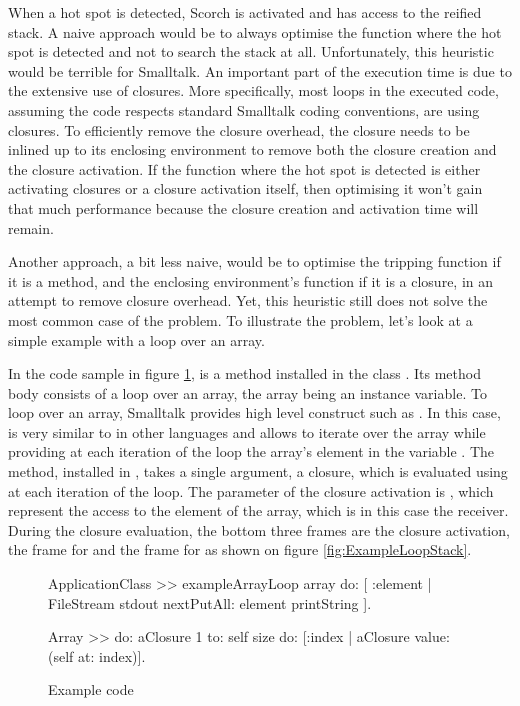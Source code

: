 \documentclass[a4paper,12pt,twoside]{../includes/ThesisStyle}
\begin{document}
When a hot spot is detected, Scorch is activated and has access to the reified stack. A naive approach would be to always optimise the function where the hot spot is detected and not to search the stack at all. Unfortunately, this heuristic would be terrible for Smalltalk. An important part of the execution time is due to the extensive use of closures. More specifically, most loops in the executed code, assuming the code respects standard Smalltalk coding conventions, are using closures. To efficiently remove the closure overhead, the closure needs to be inlined up to its enclosing environment to remove both the closure creation and the closure activation. If the function where the hot spot is detected is either activating closures or a closure activation itself, then optimising it won't gain that much performance because the closure creation and activation time will remain.

Another approach, a bit less naive, would be to optimise the tripping function if it is a method, and the enclosing environment's function if it is a closure, in an attempt to remove closure overhead. Yet, this heuristic still does not solve the most common case of the problem. To illustrate the problem, let's look at a simple example with a loop over an array.

In the code sample in figure \ref{fig:ExampleCode},  is a method installed in the class . Its method body consists of a loop over an array, the array being an instance variable. To loop over an array, Smalltalk provides high level construct such as . In this case,  is very similar to  in other languages and allows to iterate over the array while providing at each iteration of the loop the array's element in the variable . The  method, installed in , takes a single argument, a closure, which is evaluated using  at each iteration of the loop. The parameter of the closure activation is , which represent the access to the element  of the array, which is in this case the receiver. During the closure evaluation, the bottom three frames are the closure activation, the frame for  and the frame for  as shown on figure \ref{fig:ExampleLoopStack}.

\begin{figure}[h!]
    \begin{center}
        \begin{code}
        	ApplicationClass >> exampleArrayLoop
        	    array do: [ :element | FileStream stdout nextPutAll: element printString ].
        		
        	Array >> do: aClosure
        	    1 to: self size do: [:index | aClosure value: (self at: index)].
        \end{code}   
	\caption{Example code}
        \label{fig:ExampleCode}
    \end{center}
\end{figure}
\end{document}
